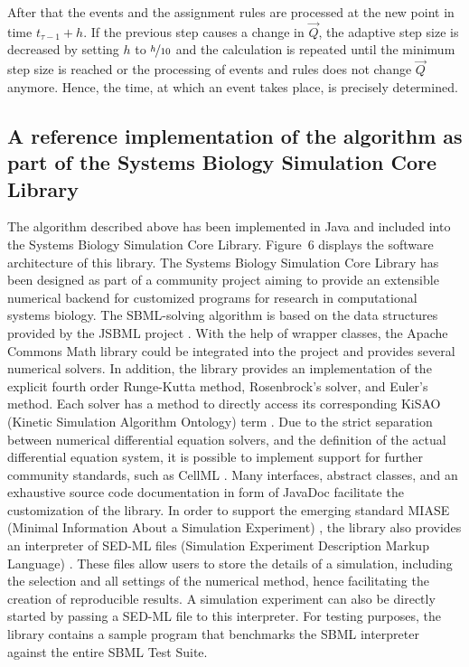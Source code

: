 \documentclass[10pt]{bmc_article}
\newenvironment{bmcformat}{\baselineskip20pt\sloppy\setboolean{publ}{false}}{\baselineskip20pt\sloppy}
\begin{document}
\begin{bmcformat}
After that the events and the assignment rules are processed at the new point in time $t_{\tau - 1} + h$.
If the previous step causes a change in $\vec{Q}$, the adaptive step size is decreased by setting $h$ to $\nicefrac{h}{10}$ and
the calculation is repeated until the minimum step size is reached or the processing of events and rules does not change $\vec{Q}$ anymore.
Hence, the time, at which an event takes place, is precisely determined.

\subsection*{A reference implementation of the algorithm as part of the Systems Biology Simulation Core Library}

The algorithm described above has been implemented in Java\texttrademark{} and included into the Systems Biology Simulation Core Library.
Figure~6 displays the software architecture of this library.
The Systems Biology Simulation Core Library has been designed as part of a community project aiming to provide an extensible numerical backend for customized programs for research in computational systems biology.
The SBML-solving algorithm is based on the data structures provided by the JSBML project \cite{Draeger2008}.
With the help of wrapper classes, the Apache Commons Math library could be integrated into the project and provides several numerical solvers.
In addition, the library provides an implementation of the explicit fourth order Runge-Kutta method, Rosenbrock's solver, and Euler's method.
Each solver has a method to directly access its corresponding KiSAO (Kinetic Simulation Algorithm Ontology) term \cite{Courtot2011}.
Due to the strict separation between numerical differential equation solvers, and the definition of the actual differential equation system, it is possible to implement support for further community standards, such as CellML \cite{Lloyd2004}.
Many interfaces, abstract classes, and an exhaustive source code documentation in form of JavaDoc facilitate the customization of the library.
In order to support the emerging standard MIASE (Minimal Information About a Simulation Experiment) \cite{Waltemath2011a}, the library also provides an interpreter of SED-ML files (Simulation Experiment Description Markup Language) \cite{Waltemath2011}.
These files allow users to store the details of a simulation, including the selection and all settings of the numerical method, hence facilitating the creation of reproducible results.
A simulation experiment can also be directly started by passing a SED-ML file to this interpreter.
For testing purposes, the library contains a sample program that benchmarks the SBML interpreter against the entire SBML Test Suite.



\end{bmcformat}
\end{document}
